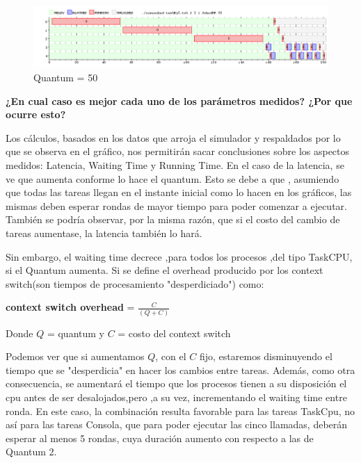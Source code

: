 \documentclass[10pt, a4paper]{article}
\begin{document}
\begin{figure}[H]
  	\centering
   	\includegraphics[width=1\textwidth]
   	 {imgs/quantum50.png}
	\caption{Quantum = 50}
\end{figure}
	

\begin{flushleft}
\textbf{¿En cual caso es mejor cada uno de los parámetros medidos? ¿Por que ocurre esto?}\\

\end{flushleft}


Los cálculos, basados en los datos que arroja el simulador y respaldados por lo que se observa en el gráfico, nos permitirán sacar conclusiones sobre los aspectos medidos: Latencia, Waiting Time y Running Time.
En el caso de la latencia, se ve que aumenta conforme lo hace el quantum. Esto se debe a que , asumiendo que todas las tareas llegan en el instante inicial como lo hacen en los gráficos, las mismas deben esperar rondas de mayor tiempo para poder comenzar a ejecutar. También se podría observar, por la misma razón, que si el costo del cambio de tareas aumentase, la latencia también lo hará.

Sin embargo, el waiting time decrece ,para todos los procesos ,del tipo TaskCPU, si el Quantum aumenta.
Si se define el overhead producido por los context switch(son tiempos de procesamiento "desperdiciado") como: \\

\begin{center}
\textbf{context switch overhead} = $\frac{C}{(Q+C)}$
\end{center}

Donde $Q$ = quantum y $C$ = costo del context switch

Podemos ver que si  aumentamos $Q$, con el $C$ fijo, estaremos disminuyendo el tiempo que se "desperdicia" en hacer los cambios entre tareas.
Además, como otra consecuencia, se aumentará el tiempo que los procesos tienen a su disposición el cpu antes de ser desalojados,pero ,a su vez, incrementando el waiting time entre ronda. En este caso, la combinación  resulta favorable para las tareas TaskCpu, no así para las tareas Consola, que para poder ejecutar las cinco llamadas, deberán esperar al menos 5 rondas, cuya duración aumento con respecto a las de Quantum 2.
\end{document}
